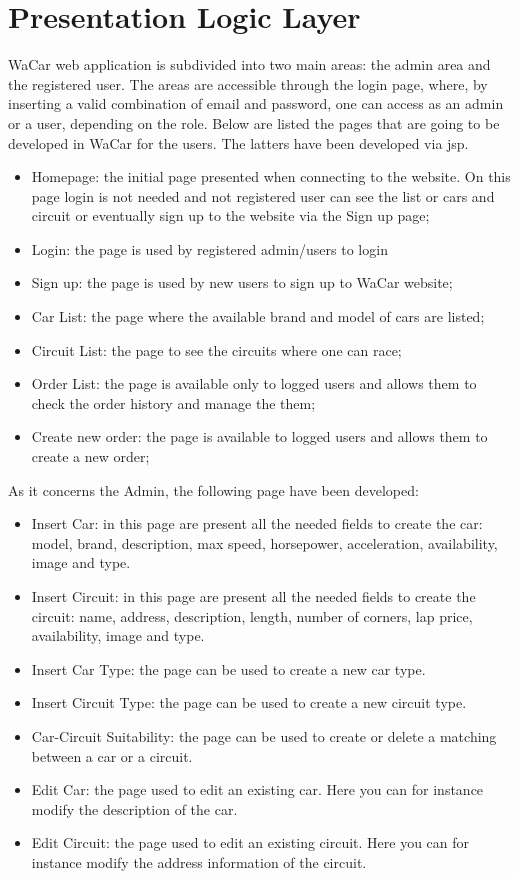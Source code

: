 \section{Presentation Logic Layer}


WaCar web application is subdivided into two main areas: the admin area and the registered user. The areas are accessible through the login page, where, by inserting a valid combination of email and password, one can access as an admin or a user, depending on the role. Below are listed the pages that are going to be developed in WaCar for the users. The latters have been developed via jsp.
\begin{itemize}
    \item Homepage: the initial page presented when connecting to the website. On this page login is not needed and not registered user can see the list or cars and circuit or eventually sign up to the website via the Sign up page;
    \item Login: the page is used by registered admin/users to login
    \item Sign up: the page is used by new users to sign up to WaCar website;
    \item Car List: the page where the available brand and model of cars are listed;
    \item Circuit List: the page to see the circuits where one can race;
    \item Order List: the page is available only to logged users and allows them to check the order history and manage the them;
    \item Create new order: the page is available to logged users and allows them to create a new order;
\end{itemize}

As it concerns the Admin, the following page have been developed:
\begin{itemize}
    \item Insert Car: in this page are present all the needed fields to create the car: model, brand, description, max speed, horsepower, acceleration, availability, image and type.
    \item Insert Circuit: in this page are present all the needed fields to create the circuit: name, address, description, length, number of corners, lap price, availability, image and type.
    \item Insert Car Type: the page can be used to create a new car type.
    \item Insert Circuit Type: the page can be used to create a new circuit type.
    \item Car-Circuit Suitability: the page can be used to create or delete a matching between a car or a circuit.
    \item Edit Car: the page used to edit an existing car. Here you can for instance modify the description of the car.
    \item Edit Circuit: the page used to edit an existing circuit. Here you can for instance modify the address information of the circuit.
\end{itemize}

